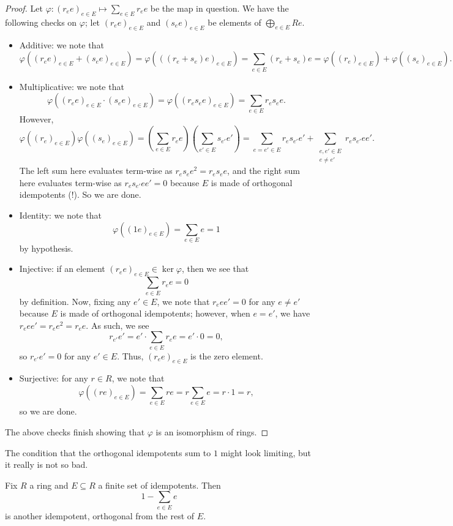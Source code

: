 \documentclass[../notes.tex]{subfiles}
\begin{document}
\begin{proof}
	Let $\varphi:(r_ee)_{e\in E}\mapsto\sum_{e\in E}r_ee$ be the map in question. We have the following checks on $\varphi$; let $(r_ee)_{e\in E}$ and $(s_ee)_{e\in E}$ be elements of $\bigoplus_{e\in E}Re$.
	\begin{itemize}
		\item Additive: we note that
		\[\varphi\left((r_ee)_{e\in E}+(s_ee)_{e\in E}\right)=\varphi\left(((r_e+s_e)e)_{e\in E}\right)=\sum_{e\in E}(r_e+s_e)e=\varphi\left((r_e)_{e\in E}\right)+\varphi\left((s_e)_{e\in E}\right).\]
		\item Multiplicative: we note that
		\[\varphi\left((r_ee)_{e\in E}\cdot(s_ee)_{e\in E}\right)=\varphi\left((r_es_ee)_{e\in E}\right)=\sum_{e\in E}r_es_ee.\]
		However,
		\[\varphi\left((r_e)_{e\in E}\right)\varphi\left((s_e)_{e\in E}\right)=\left(\sum_{e\in E}r_ee\right)\left(\sum_{e'\in E}s_{e'}e'\right)=\sum_{e=e'\in E}r_es_{e'}e'+\sum_{\substack{e,e'\in E\\e\ne e'}}r_es_{e'}ee'.\]
		The left sum here evaluates term-wise as $r_es_ee^2=r_es_ee$, and the right sum here evaluates term-wise as $r_es_{e'}ee'=0$ because $E$ is made of orthogonal idempotents (!). So we are done.
		\item Identity: we note that
		\[\varphi\left((1e)_{e\in E}\right)=\sum_{e\in E}e=1\]
		by hypothesis.
		\item Injective: if an element $(r_ee)_{e\in E}\in\ker\varphi$, then we see that
		\[\sum_{e\in E}r_ee=0\]
		by definition. Now, fixing any $e'\in E$, we note that $r_eee'=0$ for any $e\ne e'$ because $E$ is made of orthogonal idempotents; however, when $e=e'$, we have $r_eee'=r_ee^2=r_ee$. As such, we see
		\[r_{e'}e'=e'\cdot\sum_{e\in E}r_ee=e'\cdot0=0,\]
		so $r_{e'}e'=0$ for any $e'\in E$. Thus, $(r_ee)_{e\in E}$ is the zero element.
		\item Surjective: for any $r\in R$, we note that
		\[\varphi\left((re)_{e\in E}\right)=\sum_{e\in E}re=r\sum_{e\in E}e=r\cdot1=r,\]
		so we are done.
	\end{itemize}
	The above checks finish showing that $\varphi$ is an isomorphism of rings.
\end{proof}
The condition that the orthogonal idempotents sum to $1$ might look limiting, but it really is not so bad.
\begin{lemma}
	Fix $R$ a ring and $E\subseteq R$ a finite set of idempotents. Then
	\[1-\sum_{e\in E}e\]
	is another idempotent, orthogonal from the rest of $E$.
\end{lemma}
\end{document}
